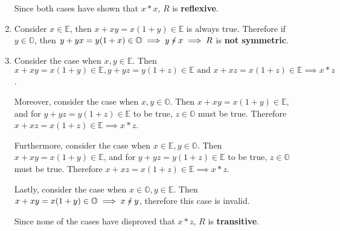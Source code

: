 \documentclass[12pt]{article}
\newcommand{\nir}{\mathrel{\mathrlap{/}*}}
\newenvironment{ps}
{\begin{enumerate}[leftmargin=0em, itemindent=1.5em]}
{\end{enumerate}}
\begin{document}
\begin{ps}
\begin{enumerate}[label=\arabic*.]
                Since both cases have shown that \( x*x\), \( R \) is \textbf{reflexive}.

            \item Consider \( x \in \mathbb{E} \), then \( x+xy = x(1+y) \in \mathbb{E} \) is always true. Therefore if \( y
                \in \mathbb{O} \), then \( y + yx = y(1+x) \in \mathbb{O} \implies y \nir x \implies R \) is \textbf{not symmetric}. 
            
            \item Consider the case when \( x, y \in \mathbb{E} \). Then \( x+xy = x(1+y) \in
                \mathbb{E}, y+yz = y(1+z) \in \mathbb{E} \text{ and } x + xz = x(1 + z) \in \mathbb{E} \implies
                x*z \).

                Moreover, consider the case when \( x, y \in \mathbb{O} \). Then \( x+xy = x(1+y) \in
                \mathbb{E} \), and for \( y+yz = y(1+z) \in \mathbb{E} \) to be true, \( z \in
                \mathbb{O} \) must be true. Therefore \( x+xz=x(1+z) \in \mathbb{E} \implies x*z \).

                Furthermore, consider the case when \( x \in \mathbb{E}, y \in \mathbb{O} \). Then
                \( x+xy = x(1+y) \in \mathbb{E} \), and for \( y+yz = y(1+z) \in \mathbb{E} \) to be
                true, \( z \in \mathbb{O} \) must be true. Therefore \( x+xz = x(1+z) \in \mathbb{E}
                \implies x*z \).

                Lastly, consider the case when \( x \in \mathbb{O}, y \in \mathbb{E} \). Then
                \( x+xy = x(1+y) \in \mathbb{O} \implies x \nir y\), therefore this case is invalid.

                Since none of the cases have disproved that \( x*z \), \( R \) is
                \textbf{transitive}.

        \end{enumerate}

\end{ps}

\newpage
\end{document}
